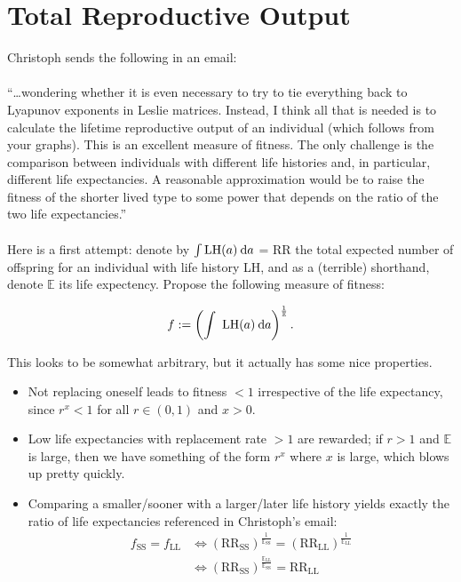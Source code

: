 \section{Total Reproductive Output}
Christoph sends the following in an email: \\ \\

``\ldots wondering whether it is even necessary to try to tie everything back to Lyapunov exponents in Leslie matrices. 
Instead, I think all that is needed is to calculate the lifetime reproductive output of an individual (which follows from 
your graphs). This is an excellent measure of fitness. The only challenge is the comparison between individuals with different life histories and, 
in particular, different life expectancies. A reasonable approximation would be to raise the fitness of the shorter lived 
type to some power that depends on the ratio of the two life expectancies.'' \\ \\

Here is a first attempt: denote by $\int \text{LH}(a) \:\textrm{d}a$ = RR the total expected number of offspring for an individual with life history
LH, and as a (terrible) shorthand, denote $\mathbb{E}$ its life expectency. Propose the following measure of fitness:

$$ f := \left( \int \text{ LH} (a) \:\textrm{d}a \right)^{\frac{1}{\mathbb{E}}}.$$

This looks to be somewhat arbitrary, but it actually has some nice properties.

\begin{itemize}
    \item Not replacing oneself leads to fitness $< 1$ irrespective of the life expectancy, since $r^x < 1$ for all $r\in(0,1)$ and
        $x > 0$. 
    \item Low life expectancies with replacement rate $> 1$ are rewarded; if $r > 1$ and $\mathbb{E}$ is large, then we have something
        of the form $r^x$ where $x$ is large, which blows up pretty quickly. 
    \item Comparing a smaller/sooner with a larger/later life history yields exactly the ratio of life expectancies referenced in 
        Christoph's email:
        \begin{align*}
            f_{\text{SS}} = f_{\text{LL}} &\iff \left( \text{RR}_{\text{SS}} \right)^{\frac{1}{\mathbb{E}_{\text{SS}}}} =
                \left( \text{RR}_{\text{LL}} \right)^{\frac{1}{\mathbb{E}_{\text{LL}}}} \\
                &\iff \left( \text{RR}_{\text{SS}} \right)^{\frac{\mathbb{E}_{\text{LL}}}{\mathbb{E}_{\text{SS}}}} = \text{RR}_{\text{LL}}
        \end{align*}
\end{itemize}

